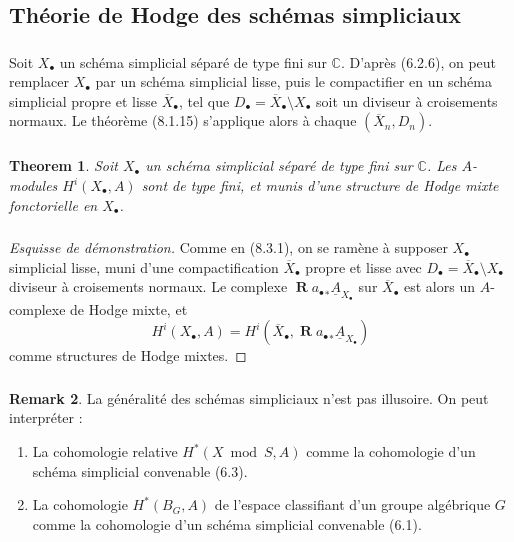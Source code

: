 \documentclass[11pt]{amsart}
\theoremstyle{plain}
\newtheorem{theorem}{Theorem}[section]
\theoremstyle{definition}
\newtheorem{remark}[theorem]{Remark}
\DeclareMathOperator{\Rd}{\mathbf{R}}
\newcommand{\CC}{\mathbb{C}}
\begin{document}
\subsection{Th\'eorie de Hodge des sch\'emas simpliciaux}

\subsubsection{}
Soit $X_\bullet$ un sch\'ema simplicial s\'epar\'e de type fini sur $\CC$. D'apr\`es (6.2.6), on peut remplacer $X_\bullet$ par un sch\'ema simplicial lisse, puis le compactifier en un sch\'ema simplicial propre et lisse $\overline{X}_\bullet$, tel que $D_\bullet = \overline{X}_\bullet \setminus X_\bullet$ soit un diviseur \`a croisements normaux. Le th\'eor\`eme (8.1.15) s'applique alors \`a chaque $(\overline{X}_n, D_n)$.

\subsubsection{}
\begin{theorem}
Soit $X_\bullet$ un sch\'ema simplicial s\'epar\'e de type fini sur $\CC$. Les $A$-modules $H^i(X_\bullet, A)$ sont de type fini, et munis d'une structure de Hodge mixte fonctorielle en $X_\bullet$.
\end{theorem}

\subsubsection{}
\begin{proof}[Esquisse de d\'emonstration]
Comme en (8.3.1), on se ram\`ene \`a supposer $X_\bullet$ simplicial lisse, muni d'une compactification $\overline{X}_\bullet$ propre et lisse avec $D_\bullet = \overline{X}_\bullet \setminus X_\bullet$ diviseur \`a croisements normaux. Le complexe $\Rd {a_\bullet}_* \underline{A}_{X_\bullet}$ sur $\overline{X}_\bullet$ est alors un $A$-complexe de Hodge mixte, et
\[
H^i(X_\bullet, A) = H^i(\overline{X}_\bullet, \Rd {a_\bullet}_* \underline{A}_{X_\bullet})
\]
comme structures de Hodge mixtes.
\end{proof}

\subsubsection{}
\begin{remark}
La g\'en\'eralit\'e des sch\'emas simpliciaux n'est pas illusoire. On peut interpr\'eter :
\begin{enumerate}
\item[(a)] La cohomologie relative $H^*(X \bmod S, A)$ comme la cohomologie d'un sch\'ema simplicial convenable (6.3).
\item[(b)] La cohomologie $H^*(B_G, A)$ de l'espace classifiant d'un groupe alg\'ebrique $G$ comme la cohomologie d'un sch\'ema simplicial convenable (6.1).
\end{enumerate}
\end{remark}
\end{document}
